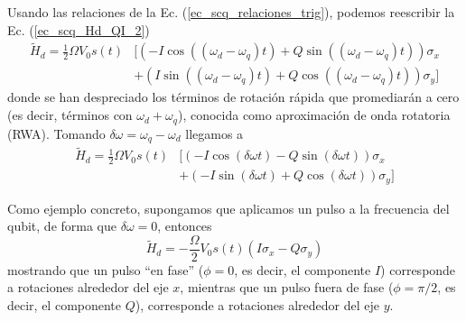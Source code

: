         Usando las relaciones de la Ec. (\ref{ec_scq_relaciones_trig}), podemos reescribir la Ec. (\ref{ec_scq_Hd_QI_2})
        \begin{equation} \label{ec_scq_Hd_QI_3}
        \begin{aligned}
            \tilde{H}_d  = \frac{1}{2} \Omega V_0 s(t) & [ (- I \cos((\omega_d - \omega_q)t)  + Q \sin((\omega_d - \omega_q)t))  \sigma_x \\
            &  +  (I \sin((\omega_d - \omega_q)t) + Q \cos((\omega_d - \omega_q)t)) \sigma_y ]
        \end{aligned}
        \end{equation}
        donde se han despreciado los términos de rotación rápida que promediarán a cero (es decir, términos con $\omega_d + \omega_q$), conocida como aproximación de onda rotatoria (RWA). Tomando $\delta \omega = \omega_q - \omega_d$ llegamos a
        \begin{equation} \label{ec_scq_Hd_QI_4}
        \begin{aligned}
            \tilde{H}_d  = \frac{1}{2} \Omega V_0 s(t) &   [(-I \cos(\delta \omega t)  - Q \sin(\delta \omega  t)) \sigma_x \\
            &  + (- I \sin(\delta \omega t) + Q \cos(\delta \omega t)) \sigma_y ]
        \end{aligned}
        \end{equation}
        
        Como ejemplo concreto, supongamos que aplicamos un pulso a la frecuencia del qubit, de forma que $\delta \omega = 0$, entonces 
        \begin{equation}
            \tilde{H}_d = - \frac{\Omega}{2} V_0 s(t) (I \sigma_x - Q \sigma_y)
        \end{equation}
        mostrando que un pulso ``en fase'' ($ \phi = 0$, es decir, el componente $I$) corresponde a rotaciones alrededor del eje $x$, mientras que un pulso fuera de fase ($\phi = \pi/2$, es decir, el componente $Q$), corresponde a rotaciones alrededor del eje $y$. 



